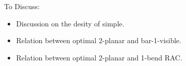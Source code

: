 \documentclass[a4paper,UKenglish]{lipics-v2016}
\begin{document}
To Discuss:

\begin{itemize}
  \item Discussion on the desity of simple.
  \item Relation between optimal 2-planar and bar-1-visible.
  \item Relation between optimal 2-planar and 1-bend RAC.
\end{itemize}



\end{document}
